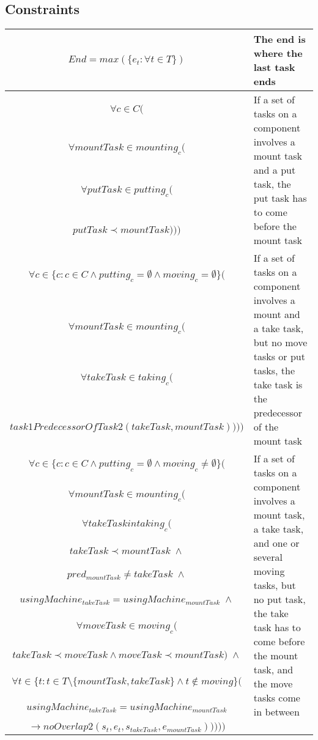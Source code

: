 \documentclass[10pt,a4paper]{report}
\begin{document}
\subsection*{Constraints}
\begin{longtable}{c p{5cm}}
$End = max(\{e_t:\forall t \in T\})$ & The end is where the last task ends\\

\hline

$\forall c \in C($ & \multirow{4}{5cm}{If a set of tasks on a component involves a mount task and a put task, the put task has to come before the mount task} \\
$\forall mountTask \in mounting_c($\\
$\forall putTask \in putting_c($\\
$putTask \prec mountTask)))$\\

\hline

$\forall c \in \{c:c \in C \land putting_c = \emptyset \land moving_c = \emptyset\}($ & \multirow{4}{5cm}{If a set of tasks on a component involves a mount and a take task, but no move tasks or put tasks, the take task is the predecessor of the mount task} \\
$\forall mountTask \in mounting_c($\\
$\forall takeTask \in taking_c($\\
$task1PredecessorOfTask2(takeTask, mountTask))))$\\

\hline

$\forall c \in \{c:c \in C \land putting_c = \emptyset \land moving_c \neq \emptyset\}($ & \multirow{10}{5cm}{If a set of tasks on a component involves a mount task, a take task, and one or several moving tasks, but no put task, the take task has to come before the mount task, and the move tasks come in between} \\
$\forall mountTask \in mounting_c($\\
$\forall takeTask in taking_c($\\
$takeTask \prec mountTask \; \land$\\
$pred_{mountTask} \neq takeTask \; \land$\\
$usingMachine_{takeTask} = usingMachine_{mountTask} \; \land$\\
$\forall moveTask \in moving_c($\\
$takeTask \prec moveTask \land moveTask \prec mountTask) \; \land$\\
$\forall t \in \{t:t \in T\setminus\{mountTask, takeTask\} \land t \not \in moving\}($\\
$usingMachine_{takeTask} = usingMachine_{mountTask}$\\
$\to noOverlap2(s_t, e_t, s_{takeTask}, e_{mountTask})))))$\\


\end{longtable}
\end{document}
